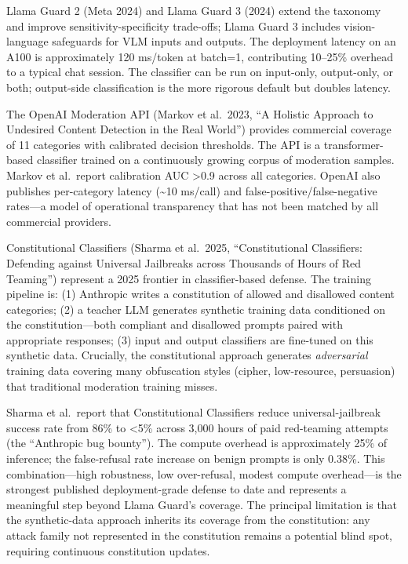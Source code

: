 \documentclass{article}
\begin{document}
Llama Guard 2 (Meta 2024) and Llama Guard 3 (2024) extend the taxonomy and improve sensitivity-specificity trade-offs; Llama Guard 3 includes vision-language safeguards for VLM inputs and outputs. The deployment latency on an A100 is approximately 120 ms/token at batch=1, contributing 10--25\% overhead to a typical chat session. The classifier can be run on input-only, output-only, or both; output-side classification is the more rigorous default but doubles latency.

The OpenAI Moderation API (Markov et al.~2023, ``A Holistic Approach to Undesired Content Detection in the Real World'') provides commercial coverage of 11 categories with calibrated decision thresholds. The API is a transformer-based classifier trained on a continuously growing corpus of moderation samples. Markov et al.~report calibration AUC \textgreater0.9 across all categories. OpenAI also publishes per-category latency (\textasciitilde10 ms/call) and false-positive/false-negative rates---a model of operational transparency that has not been matched by all commercial providers.

Constitutional Classifiers (Sharma et al.~2025, ``Constitutional Classifiers: Defending against Universal Jailbreaks across Thousands of Hours of Red Teaming'') represent a 2025 frontier in classifier-based defense. The training pipeline is: (1) Anthropic writes a constitution of allowed and disallowed content categories; (2) a teacher LLM generates synthetic training data conditioned on the constitution---both compliant and disallowed prompts paired with appropriate responses; (3) input and output classifiers are fine-tuned on this synthetic data. Crucially, the constitutional approach generates \emph{adversarial} training data covering many obfuscation styles (cipher, low-resource, persuasion) that traditional moderation training misses.

Sharma et al.~report that Constitutional Classifiers reduce universal-jailbreak success rate from 86\% to \textless5\% across 3,000 hours of paid red-teaming attempts (the ``Anthropic bug bounty''). The compute overhead is approximately 25\% of inference; the false-refusal rate increase on benign prompts is only 0.38\%. This combination---high robustness, low over-refusal, modest compute overhead---is the strongest published deployment-grade defense to date and represents a meaningful step beyond Llama Guard's coverage. The principal limitation is that the synthetic-data approach inherits its coverage from the constitution: any attack family not represented in the constitution remains a potential blind spot, requiring continuous constitution updates.
\end{document}
